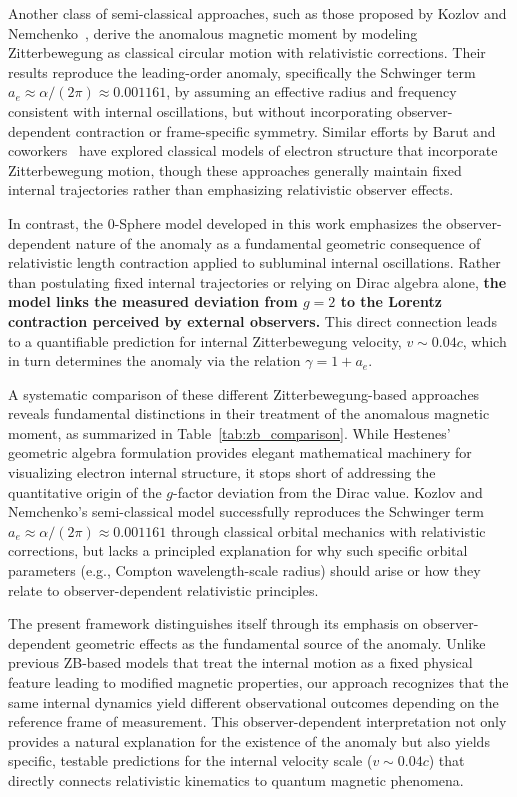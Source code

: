 \documentclass[%
 reprint,
 amsmath,amssymb,
 aps,
]{revtex4-1}
\numberwithin{equation}{section}%
\begin{document}
Another class of semi-classical approaches, such as those proposed by Kozlov and Nemchenko~\cite{kozlov2012}, derive the anomalous magnetic moment by modeling Zitterbewegung as classical circular motion with relativistic corrections. Their results reproduce the leading-order anomaly, specifically the Schwinger term~\cite{schwinger1948} $a_e \approx \alpha/(2\pi) \approx 0.001161$, by assuming an effective radius and frequency consistent with internal oscillations, but without incorporating observer-dependent contraction or frame-specific symmetry. Similar efforts by Barut and coworkers~\cite{barut1981,barut1984} have explored classical models of electron structure that incorporate Zitterbewegung motion, though these approaches generally maintain fixed internal trajectories rather than emphasizing relativistic observer effects.

In contrast, the 0-Sphere model developed in this work emphasizes the observer-dependent nature of the anomaly as a fundamental geometric consequence of relativistic length contraction applied to subluminal internal oscillations. Rather than postulating fixed internal trajectories or relying on Dirac algebra alone, \textbf{the model links the measured deviation from $g = 2$ to the Lorentz contraction perceived by external observers.} This direct connection leads to a quantifiable prediction for internal Zitterbewegung velocity, $v \sim 0.04c$, which in turn determines the anomaly via the relation $\gamma = 1 + a_e$.

A systematic comparison of these different Zitterbewegung-based approaches reveals fundamental distinctions in their treatment of the anomalous magnetic moment, as summarized in Table~\ref{tab:zb_comparison}. While Hestenes' geometric algebra formulation provides elegant mathematical machinery for visualizing electron internal structure, it stops short of addressing the quantitative origin of the $g$-factor deviation from the Dirac value. Kozlov and Nemchenko's semi-classical model successfully reproduces the Schwinger term $a_e \approx \alpha/(2\pi) \approx 0.001161$ through classical orbital mechanics with relativistic corrections, but lacks a principled explanation for why such specific orbital parameters (e.g., Compton wavelength-scale radius) should arise or how they relate to observer-dependent relativistic principles.

The present framework distinguishes itself through its emphasis on observer-dependent geometric effects as the fundamental source of the anomaly. Unlike previous ZB-based models that treat the internal motion as a fixed physical feature leading to modified magnetic properties, our approach recognizes that the same internal dynamics yield different observational outcomes depending on the reference frame of measurement. This observer-dependent interpretation not only provides a natural explanation for the existence of the anomaly but also yields specific, testable predictions for the internal velocity scale ($v \sim 0.04c$) that directly connects relativistic kinematics to quantum magnetic phenomena.
\end{document}
